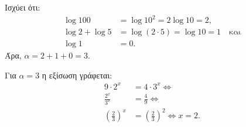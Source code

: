 \begin{alist}
\item Ισχύει ότι:
\begin{align*}
\log 100 &= \log 10^2 = 2\log 10 = 2, \\
\log 2 + \log 5 &= \log(2 \cdot 5) = \log 10 = 1 \quad \text{και} \\
\log 1 &= 0.
\end{align*}
Άρα, $\alpha = 2 + 1 + 0 = 3$.
\item Για $\alpha = 3$ η εξίσωση γράφεται:
\begin{align*}
9 \cdot 2^x &= 4 \cdot 3^x \Leftrightarrow \\
\frac{2^x}{3^x} &= \frac{4}{9} \Leftrightarrow \\
\left(\frac{2}{3}\right)^x &= \left(\frac{2}{3}\right)^2 \Leftrightarrow x = 2.
\end{align*}
\end{alist}

